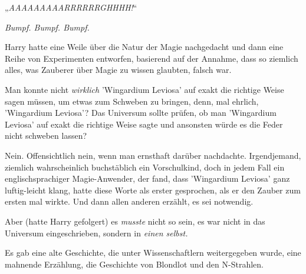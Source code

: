 „\emph{AAAAAAAAARRRRRRGHHHH!}“

\emph{Bumpf. Bumpf. Bumpf.}

Harry hatte eine Weile über die Natur der Magie nachgedacht und dann eine Reihe von Experimenten entworfen, basierend auf der Annahme, dass so ziemlich alles, was Zauberer über Magie zu wissen glaubten, falsch war.

Man konnte nicht \emph{wirklich} 'Wingardium Leviosa' auf exakt die richtige Weise sagen müssen, um etwas zum Schweben zu bringen, denn, mal ehrlich, 'Wingardium Leviosa'? Das Universum sollte prüfen, ob man 'Wingardium Leviosa' auf exakt die richtige Weise sagte und ansonsten würde es die Feder nicht schweben lassen?

Nein. Offensichtlich nein, wenn man ernsthaft darüber nachdachte. Irgendjemand, ziemlich wahrscheinlich buchstäblich ein Vorschulkind, doch in jedem Fall ein englischsprachiger Magie-Anwender, der fand, dass 'Wingardium Leviosa' ganz luftig-leicht klang, hatte diese Worte als erster gesprochen, als er den Zauber zum ersten mal wirkte. Und dann allen anderen erzählt, es sei notwendig.

Aber (hatte Harry gefolgert) es \emph{musste} nicht so sein, es war nicht in das Universum eingeschrieben, sondern in \emph{einen selbst.}

Es gab eine alte Geschichte, die unter Wissenschaftlern weitergegeben wurde, eine mahnende Erzählung, die Geschichte von Blondlot und den N-Strahlen.

